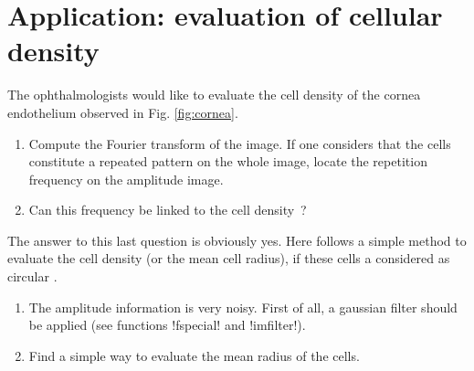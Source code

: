 \section{Application: evaluation of cellular density}
The ophthalmologists would like to evaluate the cell density of the cornea endothelium observed in Fig. \ref{fig:cornea}. %

\begin{qbox}
\begin{enumerate}
\item Compute the Fourier transform of the image. If one considers that the cells constitute a repeated pattern on the whole image, locate the repetition frequency on the amplitude image.
\item Can this frequency be linked to the cell density~?
\end{enumerate}
\end{qbox}

The answer to this last question is obviously yes. Here follows a simple method to evaluate the cell density (or the mean cell radius), if these cells a considered as circular \cite{Selig2015}.

\begin{qbox}
\begin{enumerate}
 \item The amplitude information is very noisy. First of all, a gaussian filter should be applied (see functions \minline!fspecial! and \minline!imfilter!).
 \item Find a simple way to evaluate the mean radius of the cells.
\end{enumerate}
\end{qbox}

